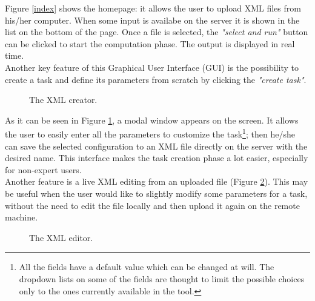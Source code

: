 Figure \ref{index} shows the homepage: it allows the user to upload XML files from his/her computer. When some input is availabe on the server it is shown in the list on the bottom of the page. Once a file is selected, the \emph{"select and run"} button can be clicked to start the computation phase. The output is displayed in real time.\\
Another key feature of this Graphical User Interface (GUI) is the possibility to create a task and define its parameters from scratch by clicking the \emph{"create task"}.

\begin{figure}[H]
  \caption{The XML creator.}
  \label{modal}
\end{figure}  

As it can be seen in Figure \ref{modal}, a modal window appears on the screen. It allows the user to easily enter all the parameters to customize the task\footnote{All the fields have a default value which can be changed at will. The dropdown lists on some of the fields are thought to limit the possible choices only to the ones currently available in the tool.}; then he/she can save the selected configuration to an XML file directly on the server with the desired name. This interface makes the task creation phase a lot easier, especially for non-expert users.\\
Another feature is a live XML editing from an uploaded file (Figure \ref{editor}). This may be useful when the user would like to slightly modify some parameters for a task, without the need to edit the file locally and then upload it again on the remote machine.

\begin{figure}[H]
  \caption{The XML editor.}
  \label{editor}
\end{figure}  
